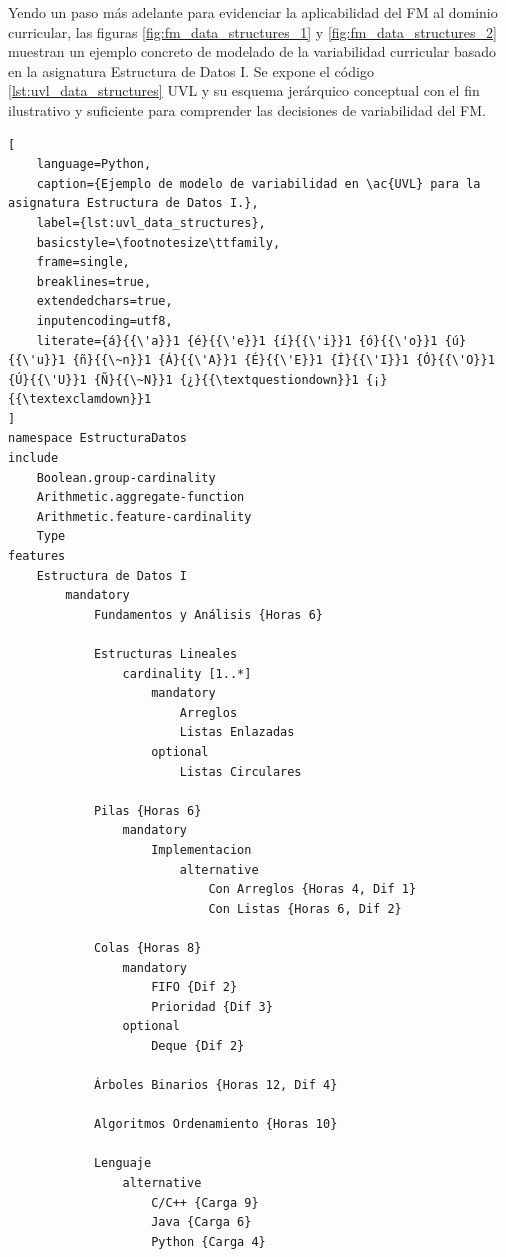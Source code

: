 Yendo un paso más adelante para evidenciar la aplicabilidad del \ac{FM}
al dominio curricular, las figuras 
\ref{fig:fm_data_structures_1} y \ref{fig:fm_data_structures_2} 
muestran un ejemplo concreto de modelado de la variabilidad curricular
basado en la asignatura Estructura de Datos I. 
Se expone el código \ref{lst:uvl_data_structures} \ac{UVL} y su 
esquema jerárquico conceptual con el fin ilustrativo y 
suficiente para comprender las decisiones de 
variabilidad del \ac{FM}.

\begin{lstlisting}[
    language=Python, 
    caption={Ejemplo de modelo de variabilidad en \ac{UVL} para la asignatura Estructura de Datos I.}, 
    label={lst:uvl_data_structures}, 
    basicstyle=\footnotesize\ttfamily, 
    frame=single, 
    breaklines=true,
    extendedchars=true,
    inputencoding=utf8,
    literate={á}{{\'a}}1 {é}{{\'e}}1 {í}{{\'i}}1 {ó}{{\'o}}1 {ú}{{\'u}}1 {ñ}{{\~n}}1 {Á}{{\'A}}1 {É}{{\'E}}1 {Í}{{\'I}}1 {Ó}{{\'O}}1 {Ú}{{\'U}}1 {Ñ}{{\~N}}1 {¿}{{\textquestiondown}}1 {¡}{{\textexclamdown}}1
]
namespace EstructuraDatos
include
    Boolean.group-cardinality
    Arithmetic.aggregate-function
    Arithmetic.feature-cardinality
    Type
features
    Estructura de Datos I
        mandatory
            Fundamentos y Análisis {Horas 6}
            
            Estructuras Lineales
                cardinality [1..*]
                    mandatory
                        Arreglos
                        Listas Enlazadas
                    optional
                        Listas Circulares
            
            Pilas {Horas 6}
                mandatory
                    Implementacion
                        alternative
                            Con Arreglos {Horas 4, Dif 1}
                            Con Listas {Horas 6, Dif 2}
            
            Colas {Horas 8}
                mandatory
                    FIFO {Dif 2}
                    Prioridad {Dif 3}
                optional
                    Deque {Dif 2}
            
            Árboles Binarios {Horas 12, Dif 4}
            
            Algoritmos Ordenamiento {Horas 10}
            
            Lenguaje
                alternative
                    C/C++ {Carga 9}
                    Java {Carga 6}
                    Python {Carga 4}
            

\end{lstlisting}
